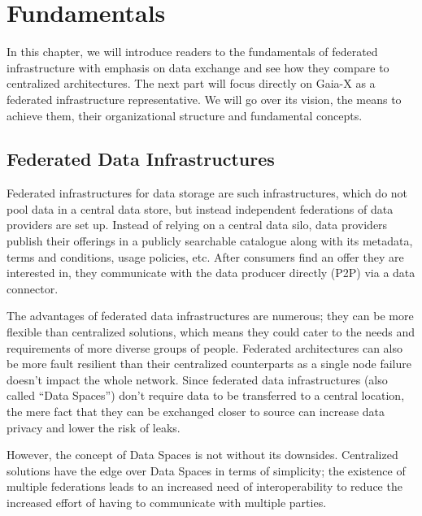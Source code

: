 \chapter{Fundamentals}\label{ch:fundamentals}

\begin{chapterabstract}
    In this chapter, we will introduce readers to the fundamentals of federated infrastructure with emphasis on data exchange and see how they compare to centralized architectures.
    The next part will focus directly on Gaia-X as a federated infrastructure representative.
    We will go over its vision, the means to achieve them, their organizational structure and fundamental concepts.
\end{chapterabstract}

\section{Federated Data Infrastructures}\label{sec:federated-data-infrastructures}

Federated infrastructures for data storage are such infrastructures, which do not pool data in a central data store, but instead independent federations of data providers are set up\cite{otto_federated_2022}.
Instead of relying on a central data silo, data providers publish their offerings in a publicly searchable catalogue along with its metadata, terms and conditions, usage policies, etc.
After consumers find an offer they are interested in, they communicate with the data producer directly (P2P) via a data connector.

The advantages of federated data infrastructures are numerous; they can be more flexible than centralized solutions, which means they could cater to the needs and requirements of more diverse groups of people\cite{raab_federated_2023}.
Federated architectures can also be more fault resilient than their centralized counterparts as a single node failure doesn't impact the whole network.
Since federated data infrastructures (also called ``Data Spaces'') don't require data to be transferred to a central location, the mere fact that they can be exchanged closer to source can increase data privacy and lower the risk of leaks.

However, the concept of Data Spaces is not without its downsides.
Centralized solutions have the edge over Data Spaces in terms of simplicity; the existence of multiple federations leads to an increased need of interoperability to reduce the increased effort of having to communicate with multiple parties.

